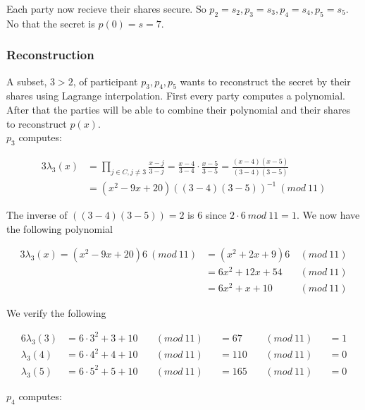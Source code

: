 \noindent
Each party now recieve their shares secure. So $p_2= s_2, p_3=s_3, p_4= s_4, p_5= s_5$. No that the secret is $p(0)=s= 7$.

\subsubsection{Reconstruction}
A subset, $3>2$, of participant $p_3, p_4, p_5$ wants to reconstruct the secret by their shares using Lagrange interpolation. First every party computes a polynomial. After that the parties will be able to combine their polynomial and their shares to reconstruct $p(x)$.\\

\noindent
$p_3$ computes:


\noindent
\begin{alignat*}{3}
\lambda_3(x)&=\prod\limits_{j\in C,j\neq3} \frac{x-j}{3-j} = \frac{x-4}{3-4} \cdot \frac{x-5}{3-5} =\frac{(x-4)(x-5)}{(3-4)(3-5)}  \\
&= (x^2-9x+20)((3-4)(3-5))^{-1} \ (mod \ 11)
\end{alignat*}

\noindent
The inverse of  $((3-4)(3-5))= 2$ is $6$ since $2 \cdot 6 \ mod \ 11 = 1$. We now have the following polynomial

\noindent
\begin{alignat*}{3}
\lambda_3(x) = (x^2-9x+20)6 \ (mod \ 11) &= (x^2 + 2x+9)6 \ &(mod \ 11) \\
&= 6x^2 + 12x + 54 \ &(mod \ 11) \\
&= 6x^2+x+ 10 \ &(mod \ 11) 
\end{alignat*}

\noindent
We verify the following


\noindent
\begin{alignat*}{6}
\lambda_3(3) &=  6 \cdot 3^2+3+ 10  \ &&(mod \ 11) &&= 67 \ &&(mod \ 11) &&= 1 \\
\lambda_3(4) &=  6 \cdot 4^2+4+ 10  \ &&(mod \ 11) &&= 110 \ &&(mod \ 11) &&= 0 \\
\lambda_3(5) &=  6 \cdot 5^2+5+ 10  \ &&(mod \ 11) &&= 165 \ &&(mod \ 11) &&= 0
\end{alignat*}

\noindent
$p_4$ computes:

